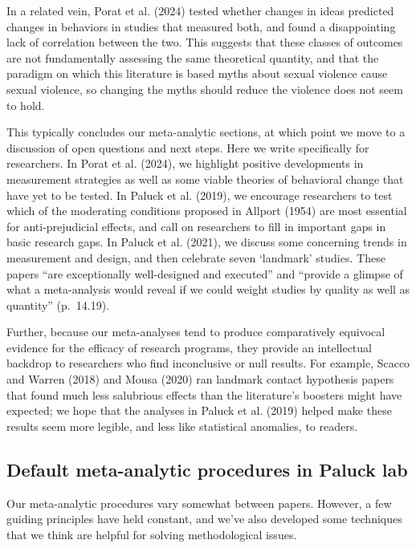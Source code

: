 \documentclass[
  ,jou]{apa6}
\begin{document}
In a related vein, Porat et al. (2024) tested whether changes in ideas predicted changes in behaviors in studies that measured both, and found a disappointing lack of correlation between the two. This suggests that these classes of outcomes are not fundamentally assessing the same theoretical quantity, and that the paradigm on which this literature is based \textemdash myths about sexual violence cause sexual violence, so changing the myths should reduce the violence \textemdash does not seem to hold.

This typically concludes our meta-analytic sections, at which point we move to a discussion of open questions and next steps. Here we write specifically for researchers. In Porat et al. (2024), we highlight positive developments in measurement strategies as well as some viable theories of behavioral change that have yet to be tested. In Paluck et al. (2019), we encourage researchers to test which of the moderating conditions proposed in Allport (1954) are most essential for anti-prejudicial effects, and call on researchers to fill in important gaps in basic research gaps. In Paluck et al. (2021), we discuss some concerning trends in measurement and design, and then celebrate seven `landmark' studies. These papers ``are exceptionally well-designed and executed'' and ``provide a glimpse of what a meta-analysis would reveal if we could weight studies by quality as well as quantity'' (p.~14.19).

Further, because our meta-analyses tend to produce comparatively equivocal evidence for the efficacy of research programs, they provide an intellectual backdrop to researchers who find inconclusive or null results. For example, Scacco and Warren (2018) and Mousa (2020) ran landmark contact hypothesis papers that found much less salubrious effects than the literature's boosters might have expected; we hope that the analyses in Paluck et al. (2019) helped make these results seem more legible, and less like statistical anomalies, to readers.

\subsection{Default meta-analytic procedures in Paluck lab}\label{default-meta-analytic-procedures-in-paluck-lab}

Our meta-analytic procedures vary somewhat between papers. However, a few guiding principles have held constant, and we've also developed some techniques that we think are helpful for solving methodological issues.
\end{document}
